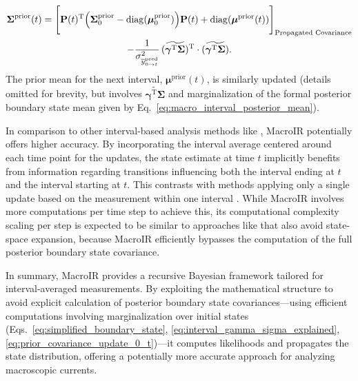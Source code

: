 \documentclass[pdflatex,sn-nature]{sn-jnl}%
\begin{document}
\begin{multline}
	\boldsymbol{\Sigma}^{\text{prior}}(t) = \Biggl[ \mathbf{P}(t)^{\mathrm{T}} \Bigl( \boldsymbol{\Sigma}^{\text{prior}}_{0} - \mathrm{diag}(\boldsymbol{\mu}^{\text{prior}}_{0}) \Bigr) \mathbf{P}(t) + \mathrm{diag}(\boldsymbol{\mu}^{\text{prior}}(t)) \Biggr]_{\text{Propagated Covariance}} \\ 
	- \frac{1}{\sigma^2_{\overline{y}^{\text{pred}}_{0 \rightarrow t}}} \, (\widetilde{\boldsymbol{\gamma}^{\mathrm{T}} \boldsymbol{\Sigma}})^{\mathrm{T}} \cdot (\widetilde{\boldsymbol{\gamma}^{\mathrm{T}} \boldsymbol{\Sigma}}). 
	\label{eq:prior_covariance_update_0_t} %
\end{multline}
The prior mean for the next interval, \( \boldsymbol{\mu}^{\text{prior}}(t) \), is similarly updated (details omitted for brevity, but involves \( \widetilde{\boldsymbol{\gamma}^{\mathrm{T}} \boldsymbol{\Sigma}} \) and marginalization of the formal posterior boundary state mean given by Eq.~\ref{eq:macro_interval_posterior_mean}). 

In comparison to other interval-based analysis methods like \cite{Munch2022}, MacroIR potentially offers higher accuracy. By incorporating the interval average centered around each time point for the updates, the state estimate at time \(t\) implicitly benefits from information regarding transitions influencing both the interval ending at \(t\) and the interval starting at \(t\). This contrasts with methods applying only a single update based on the measurement within one interval \cite{Munch2022}. While MacroIR involves more computations per time step to achieve this, its computational complexity scaling per step is expected to be similar to approaches like \cite{Munch2022} that also avoid state-space expansion, because MacroIR efficiently bypasses the computation of the full posterior boundary state covariance.

In summary, MacroIR provides a recursive Bayesian framework tailored for interval-averaged measurements. By exploiting the mathematical structure to avoid explicit calculation of posterior boundary state covariances—using efficient computations involving marginalization over initial states (Eqs.~\ref{eq:simplified_boundary_state}, \ref{eq:interval_gamma_sigma_explained}, \ref{eq:prior_covariance_update_0_t})—it computes likelihoods and propagates the state distribution, offering a potentially more accurate approach for analyzing macroscopic currents.
\end{document}
